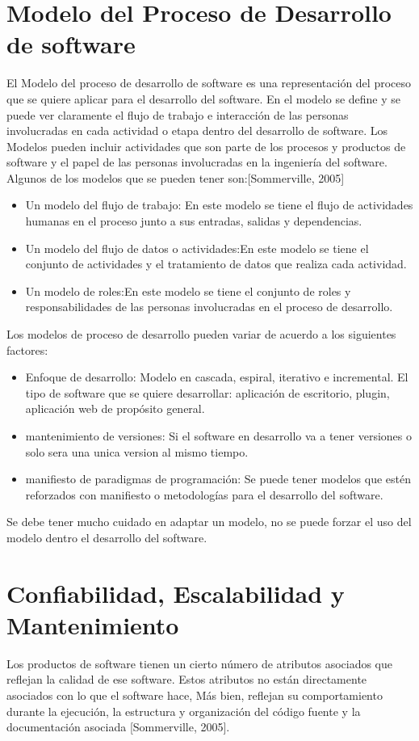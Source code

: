 \section{Modelo del Proceso de Desarrollo de software}
\noindent El Modelo del proceso de desarrollo de software es una representación del proceso que se quiere aplicar para el desarrollo del software. En el modelo se define y se puede ver claramente el flujo de trabajo e interacción de las personas involucradas en cada actividad o etapa dentro del desarrollo de software.
\noindent Los Modelos pueden incluir actividades que son parte de los procesos y productos de software y el papel de las personas involucradas en la ingeniería del software. Algunos de los modelos que se pueden tener son:[Sommerville, 2005]
\begin{itemize}
\item Un modelo del flujo de trabajo: En este modelo se tiene el flujo de actividades humanas en el proceso junto a sus entradas, salidas y dependencias.
\item Un modelo del flujo de datos o actividades:En este modelo se tiene el conjunto de actividades y el tratamiento de datos que realiza cada actividad.
\item Un modelo de roles:En este modelo se tiene el conjunto de roles y responsabilidades de las personas involucradas en el proceso de desarrollo.
\end{itemize}

\noindent Los modelos de proceso de desarrollo pueden variar de acuerdo a los siguientes factores:
\begin{itemize}
\item Enfoque de desarrollo: Modelo en cascada, espiral, iterativo e incremental.
El tipo de software que se quiere desarrollar: aplicación de escritorio, plugin, aplicación web de propósito general.
\item mantenimiento de versiones: Si el software en desarrollo va a tener versiones o solo sera una unica version al mismo tiempo.
\item manifiesto de paradigmas de programación: Se puede tener modelos que estén reforzados con manifiesto o metodologías para el desarrollo del software.
\end{itemize}
\noindent Se debe tener mucho cuidado en adaptar un modelo, no se puede forzar el uso del modelo dentro el desarrollo del software.   

\section{Confiabilidad, Escalabilidad y Mantenimiento}
\noindent Los productos de software tienen un cierto número de atributos asociados que reflejan la calidad de ese software. Estos atributos no están directamente asociados con lo que el software hace, Más bien, reflejan su comportamiento durante la ejecución, la estructura y organización del código fuente y la documentación asociada [Sommerville, 2005].

